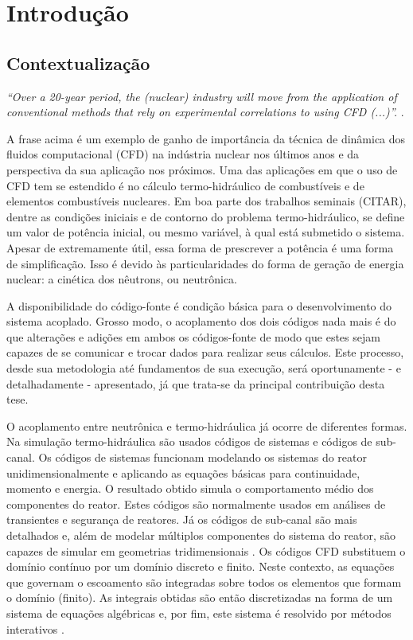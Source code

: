 \chapter{Introdução}
\label{chap:introducao}

\section{Contextualização}

\emph{``Over a 20-year period, the (nuclear) industry will move from 
the application of conventional methods that rely on 
experimental correlations to using CFD (...)''.} \cite[p.~655]{Baglietto2011}.

A frase acima é um exemplo de ganho de importância da técnica de dinâmica dos fluidos 
computacional (CFD) na indústria nuclear nos últimos anos e da perspectiva da sua aplicação 
nos próximos. Uma das aplicações em que o uso de CFD tem se estendido é no cálculo termo-hidráulico
de combustíveis e de elementos combustíveis nucleares. Em boa parte dos trabalhos seminais (CITAR), dentre
as condições iniciais e de contorno do problema termo-hidráulico, se define um valor de potência inicial,
ou mesmo variável, à qual está submetido o sistema. Apesar de extremamente útil, essa forma de prescrever a
potência é uma forma de simplificação. Isso é devido às particularidades do forma de geração de energia nuclear:
a cinética dos nêutrons, ou neutrônica.

A disponibilidade do código-fonte é condição básica para o desenvolvimento do sistema acoplado. Grosso modo, o acoplamento
dos dois códigos nada mais é do que alterações e adições em ambos os códigos-fonte de modo
que estes sejam capazes de se comunicar e trocar dados para realizar seus cálculos.
Este processo, desde sua metodologia até fundamentos de sua execução, será
oportunamente - e detalhadamente - apresentado, já que trata-se da principal
contribuição desta tese.

O acoplamento entre neutrônica e termo-hidráulica já ocorre de diferentes formas. Na simulação 
termo-hidráulica são usados códigos de sistemas e códigos de sub-canal. Os códigos de sistemas 
funcionam modelando os sistemas do reator unidimensionalmente e aplicando as equações básicas 
para continuidade, momento e energia. O resultado obtido simula o
comportamento médio dos componentes do reator.
Estes códigos são normalmente usados em análises de transientes e segurança de reatores. 
Já os códigos de sub-canal são mais detalhados e, além
de modelar múltiplos componentes do sistema 
do reator, são capazes de simular em geometrias tridimensionais \cite{Faghihi2011}. Os códigos 
CFD substituem o domínio contínuo por um domínio discreto e finito. Neste contexto, as equações 
que governam o escoamento são integradas sobre todos os elementos que formam o domínio (finito). 
As integrais obtidas são então discretizadas na forma de um sistema de equações algébricas 
e, por fim, este sistema é resolvido por métodos interativos \cite{Versteeg2007}.

